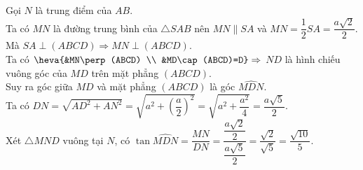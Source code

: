 \begin{ex}
{\begin{itemchoice}
			\itemch 
			Gọi $N$ là trung điểm  của $AB$. \\
			Ta có $MN$ là đường trung bình của $\triangle SAB$ nên  $MN\parallel SA$ và $MN=\dfrac{1}{2} SA=\dfrac{a\sqrt{2}}{2}$. \\
			Mà  $SA\perp (ABCD)\Rightarrow MN\perp (ABCD)$. \\
			 Ta có $\heva{&MN\perp (ABCD) \\
			&MD\cap (ABCD)=D} \Rightarrow$ $ND$ là hình chiếu vuông  góc của $MD$ trên mặt phẳng $(ABCD)$. \\
			Suy ra góc giữa  $MD$ và mặt phẳng $(ABCD)$ là góc $\widehat{MDN}$. \\
			Ta có $DN=\sqrt{AD^2+AN^2}=\sqrt{a^2+\left(\dfrac{a}{2}\right)^2}=\sqrt{a^2+\dfrac{a^2}{4}}=\dfrac{a\sqrt{5}}{2}$.  \\
			Xét $\triangle MND$ vuông tại $N$, có $\tan  \widehat{MDN}=\dfrac{MN}{DN}=\dfrac{\dfrac{a\sqrt{2}}{2}}{\dfrac{a\sqrt{5}}{2}}=\dfrac{\sqrt{2}}{\sqrt{5}}=\dfrac{\sqrt{10}}{5}$.
		\end{itemchoice}
	} 
\end{ex}

